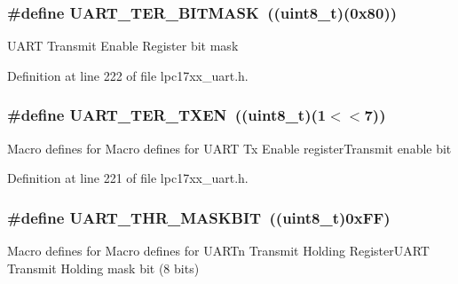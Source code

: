 \subsubsection[{\texorpdfstring{U\+A\+R\+T\+\_\+\+T\+E\+R\+\_\+\+B\+I\+T\+M\+A\+SK}{UART_TER_BITMASK}}]{\setlength{\rightskip}{0pt plus 5cm}\#define U\+A\+R\+T\+\_\+\+T\+E\+R\+\_\+\+B\+I\+T\+M\+A\+SK~(({\bf uint8\+\_\+t})(0x80))}\hypertarget{group___u_a_r_t___private___macros_ga65bbbe4fecd3da46942b07267bf5cd32}{}\label{group___u_a_r_t___private___macros_ga65bbbe4fecd3da46942b07267bf5cd32}
U\+A\+RT Transmit Enable Register bit mask 

Definition at line 222 of file lpc17xx\+\_\+uart.\+h.

\subsubsection[{\texorpdfstring{U\+A\+R\+T\+\_\+\+T\+E\+R\+\_\+\+T\+X\+EN}{UART_TER_TXEN}}]{\setlength{\rightskip}{0pt plus 5cm}\#define U\+A\+R\+T\+\_\+\+T\+E\+R\+\_\+\+T\+X\+EN~(({\bf uint8\+\_\+t})(1$<$$<$7))}\hypertarget{group___u_a_r_t___private___macros_gaa6e9b1099b787bb65c64d2e07d2fc3cf}{}\label{group___u_a_r_t___private___macros_gaa6e9b1099b787bb65c64d2e07d2fc3cf}
Macro defines for Macro defines for U\+A\+RT Tx Enable register\+Transmit enable bit 

Definition at line 221 of file lpc17xx\+\_\+uart.\+h.

\subsubsection[{\texorpdfstring{U\+A\+R\+T\+\_\+\+T\+H\+R\+\_\+\+M\+A\+S\+K\+B\+IT}{UART_THR_MASKBIT}}]{\setlength{\rightskip}{0pt plus 5cm}\#define U\+A\+R\+T\+\_\+\+T\+H\+R\+\_\+\+M\+A\+S\+K\+B\+IT~(({\bf uint8\+\_\+t})0x\+F\+F)}\hypertarget{group___u_a_r_t___private___macros_ga1592b78e87967ae6a06756679cfc855e}{}\label{group___u_a_r_t___private___macros_ga1592b78e87967ae6a06756679cfc855e}
Macro defines for Macro defines for U\+A\+R\+Tn Transmit Holding Register\+U\+A\+RT Transmit Holding mask bit (8 bits) 

